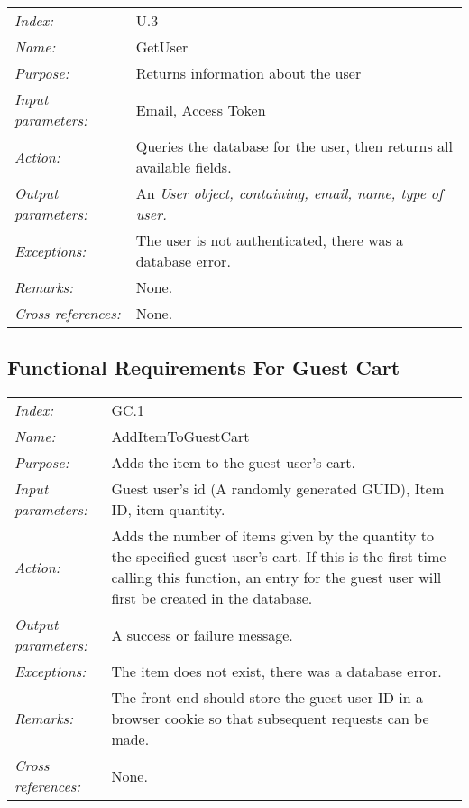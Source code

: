 \documentclass[10pt,letter]{article}
\begin{document}
\begin{tabularx}{\textwidth}{l X}
    \it{Index:} & U.3 \\
    \it{Name:} & GetUser \\
    \it{Purpose:} & Returns information about the user \\
    \it{Input parameters:} & Email, Access Token \\
    \it{Action:} & Queries the database for the user, then returns all available fields. \\
    \it{Output parameters:} &  An \it{User} object, containing, email, name, type of user.\\
    \it{Exceptions:} & The user is not authenticated, there was a database error. \\
    \it{Remarks:} & None. \\
    \it{Cross references:} & None. \\
    \hline
\end{tabularx}


\subsection{Functional Requirements For Guest Cart}

\begin{tabularx}{\textwidth}{l X}
    \it{Index:} & GC.1 \\
    \it{Name:} & AddItemToGuestCart \\
    \it{Purpose:} & Adds the item to the guest user's cart. \\
    \it{Input parameters:} & Guest user's id (A randomly generated GUID), Item ID, item quantity. \\
    \it{Action:} & Adds the number of items given by the quantity to the specified guest user's cart. If this is the first time calling this function, 
    an entry for the guest user will first be created in the database.\\
    \it{Output parameters:} & A success or failure message. \\
    \it{Exceptions:} & The item does not exist, there was a database error. \\
    \it{Remarks:} & The front-end should store the guest user ID in a browser cookie so that subsequent requests can be made. \\
    \it{Cross references:} & None. \\
    \hline
\end{tabularx}
\end{document}
